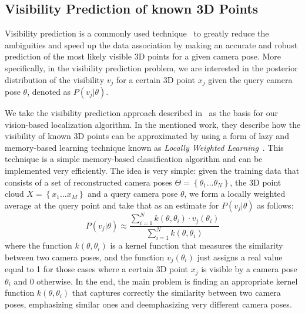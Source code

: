 \documentclass[conference]{IEEEtran}
\begin{document}
\subsection{Visibility Prediction of known 3D Points}\label{sec:visibility}
Visibility prediction is a commonly used technique~\cite{Alcantarilla11icra} to greatly reduce the ambiguities and speed up the data association by making an accurate and robust prediction of the most likely visible 3D points for a given camera pose. More specifically, in the visibility prediction problem, we are interested in the posterior distribution of the visibility $v_{j}$ for a certain 3D point $x_{j}$ given the query camera pose $\theta$, denoted as $P(v_{j} \vert \theta)$.

We take the visibility prediction approach described in~\cite{Alcantarilla11icra} as the basis for our vision-based localization algorithm. In the mentioned work, they describe how the visibility of known 3D points can be approximated by using a form of lazy and memory-based learning technique known as \textit{Locally Weighted Learning}~\cite{Atkeson97ai}. This technique is a simple memory-based classification algorithm and can be implemented very efficiently. The idea is very simple: given the training data that consists of a set of reconstructed camera poses $\Theta = \left\{\theta_1 \ldots \theta_N \right\}$, the 3D point cloud $X = \left\{x_1 \ldots x_M\right\}$ and a query camera pose $\theta$, we form a locally weighted average at the query point and take that as an estimate for $P(v_{j} \vert \theta)$ as follows:
%
\begin{equation} \label{eq:locally_weighted}
 P(v_j \vert \theta) \approx \frac{\sum\limits_{i=1}^{N} k(\theta,\theta_{i})\cdot v_j(\theta_i)}{\sum\limits_{i=1}^{N} k(\theta,\theta_{i})}
\end{equation}
%
where the function $k(\theta,\theta_{i})$ is a kernel function that measures the similarity between two camera poses, and the function $v_{j}(\theta_i)$ just assigns a real value equal to 1 for those cases where a certain 3D point $x_{j}$ is visible by a camera pose $\theta_{i}$ and 0 otherwise. In the end, the main problem is finding an appropriate kernel function $k(\theta,\theta_{i})$ that captures correctly the similarity between two camera poses, emphasizing similar ones and deemphasizing very different camera poses. 
\end{document}
